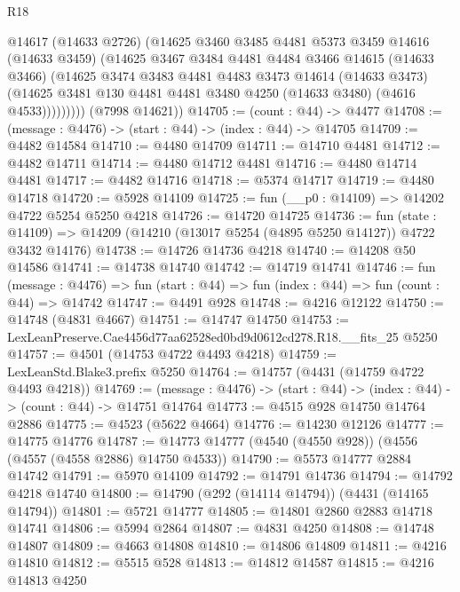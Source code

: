 \begin{lexlean}{R18}
\begin{coremodule}
              @14617
              (@14633 @2726)
              (@14625
                @3460
                @3485
                @4481
                @5373
                @3459
                @14616
                (@14633 @3459)
                (@14625
                  @3467
                  @3484
                  @4481
                  @4484
                  @3466
                  @14615
                  (@14633 @3466)
                  (@14625
                    @3474
                    @3483
                    @4481
                    @4483
                    @3473
                    @14614
                    (@14633 @3473)
                    (@14625 @3481 @130 @4481 @4481 @3480 @4250 (@14633 @3480) (@4616 @4533)))))))))
      (@7998 @14621))
@14705 := (count : @44) -> @4477
@14708 := (message : @4476) -> (start : @44) -> (index : @44) -> @14705
@14709 := @4482 @14584
@14710 := @4480 @14709
@14711 := @14710 @4481
@14712 := @4482 @14711
@14714 := @4480 @14712 @4481
@14716 := @4480 @14714 @4481
@14717 := @4482 @14716
@14718 := @5374 @14717
@14719 := @4480 @14718
@14720 := @5928 @14109
@14725 := fun (__p0 : @14109) => @14202 @4722 @5254 @5250 @4218
@14726 := @14720 @14725
@14736 := fun (state : @14109) =>
  @14209 (@14210 (@13017 @5254 (@4895 @5250 @14127)) @4722 @3432 @14176)
@14738 := @14726 @14736 @4218
@14740 := @14208 @50 @14586
@14741 := @14738 @14740
@14742 := @14719 @14741
@14746 := fun (message : @4476) =>
  fun (start : @44) => fun (index : @44) => fun (count : @44) => @14742
@14747 := @4491 @928
@14748 := @4216 @12122
@14750 := @14748 (@4831 @4667)
@14751 := @14747 @14750
@14753 := LexLeanPreserve.Cae4456d77aa62528ed0bd9d0612cd278.R18.__fits_25 @5250
@14757 := @4501 (@14753 @4722 @4493 @4218)
@14759 := LexLeanStd.Blake3.prefix @5250
@14764 := @14757 (@4431 (@14759 @4722 @4493 @4218))
@14769 := (message : @4476) -> (start : @44) -> (index : @44) -> (count : @44) -> @14751 @14764
@14773 := @4515 @928 @14750 @14764 @2886
@14775 := @4523 (@5622 @4664)
@14776 := @14230 @12126
@14777 := @14775 @14776
@14787 := @14773 @14777 (@4540 (@4550 @928)) (@4556 (@4557 (@4558 @2886) @14750 @4533))
@14790 := @5573 @14777 @2884 @14742
@14791 := @5970 @14109
@14792 := @14791 @14736
@14794 := @14792 @4218 @14740
@14800 := @14790 (@292 (@14114 @14794)) (@4431 (@14165 @14794))
@14801 := @5721 @14777
@14805 := @14801 @2860 @2883 @14718 @14741
@14806 := @5994 @2864
@14807 := @4831 @4250
@14808 := @14748 @14807
@14809 := @4663 @14808
@14810 := @14806 @14809
@14811 := @4216 @14810
@14812 := @5515 @528
@14813 := @14812 @14587
@14815 := @4216 @14813 @4250

\end{coremodule}
\end{lexlean}
